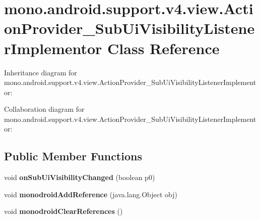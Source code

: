 \hypertarget{classmono_1_1android_1_1support_1_1v4_1_1view_1_1_action_provider___sub_ui_visibility_listener_implementor}{}\section{mono.\+android.\+support.\+v4.\+view.\+Action\+Provider\+\_\+\+Sub\+Ui\+Visibility\+Listener\+Implementor Class Reference}
\label{classmono_1_1android_1_1support_1_1v4_1_1view_1_1_action_provider___sub_ui_visibility_listener_implementor}


Inheritance diagram for mono.\+android.\+support.\+v4.\+view.\+Action\+Provider\+\_\+\+Sub\+Ui\+Visibility\+Listener\+Implementor\+:


Collaboration diagram for mono.\+android.\+support.\+v4.\+view.\+Action\+Provider\+\_\+\+Sub\+Ui\+Visibility\+Listener\+Implementor\+:
\subsection*{Public Member Functions}
\begin{DoxyCompactItemize}
\item 
\mbox{\label{classmono_1_1android_1_1support_1_1v4_1_1view_1_1_action_provider___sub_ui_visibility_listener_implementor_aa16b4664c4316a46993433708b3c1aaa}} 
void {\bfseries on\+Sub\+Ui\+Visibility\+Changed} (boolean p0)
\item 
\mbox{\label{classmono_1_1android_1_1support_1_1v4_1_1view_1_1_action_provider___sub_ui_visibility_listener_implementor_ad3bcf21e43259fd4af4b11e26ebea1bb}} 
void {\bfseries monodroid\+Add\+Reference} (java.\+lang.\+Object obj)
\item 
\mbox{\label{classmono_1_1android_1_1support_1_1v4_1_1view_1_1_action_provider___sub_ui_visibility_listener_implementor_aec92bae58c7fb25db74b6fc78f8d9eeb}} 
void {\bfseries monodroid\+Clear\+References} ()
\end{DoxyCompactItemize}
